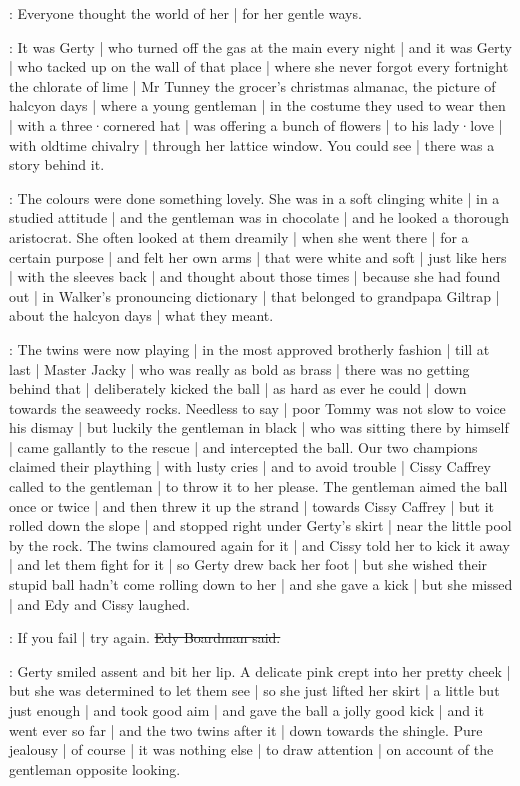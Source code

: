 \gertyNovel:
Everyone thought the world of her |
for her gentle ways.

\gertyReal:
It was Gerty |
who turned off the gas at the main every night |
and it was Gerty |
who tacked up on the wall of that place |
where she never forgot every fortnight the chlorate of lime |
Mr Tunney the grocer's christmas almanac,
the picture of halcyon days |
where a young gentleman |
in the costume they used to wear then |
with a three·cornered hat |
was offering a bunch of flowers |
to his lady·love |
with oldtime chivalry |
through her lattice window.
You could see |
there was a story behind it.

\gertyNovel:
The colours were done something lovely.
She was in a soft clinging white |
in a studied attitude |
and the gentleman was in chocolate |
and he looked a thorough aristocrat.
She often looked at them dreamily |%
when she went there |
for a certain purpose |
and felt her own arms |
that were white and soft |
just like hers |
with the sleeves back |
and thought about those times |
because she had found out |
in Walker's pronouncing dictionary |
that belonged to grandpapa Giltrap |
about the halcyon days |
what they meant.

:
The twins were now playing |
in the most approved brotherly fashion |
till at last |
Master Jacky |
who was really as bold as brass |
there was no getting behind that |
deliberately kicked the ball |
as hard as ever he could |
down towards the seaweedy rocks.
Needless to say |
poor Tommy was not slow to voice his dismay |
but luckily the gentleman in black |
who was sitting there by himself |
came gallantly to the rescue |
and intercepted the ball.%
Our two champions
claimed their plaything |
with lusty cries |
and to avoid trouble |
Cissy Caffrey called to the gentleman |
to throw it to her please.
The gentleman aimed the ball
once or twice |
and then threw it up the strand |
towards Cissy Caffrey |
but it rolled down the slope |
and stopped right under Gerty's skirt |
near the little pool by the rock.
The twins clamoured again for it |
and Cissy told her to kick it away |
and let them fight for it |
so Gerty drew back her foot |
but she wished
their stupid ball hadn't come rolling down to her |
and she gave a kick |
but she missed |
and Edy and Cissy laughed.

\edy:
If you fail |
try again.
\sout{Edy Boardman said.}

\gertyReal:
Gerty smiled assent and bit her lip.%
A delicate pink
crept into her pretty cheek |
but she was determined to let them see |
so she just lifted her skirt |
a little but just enough |
and took good aim |
and gave the ball a jolly good kick |
and it went ever so far |
and the two twins after it |
down towards the shingle.
Pure jealousy |
of course |
it was nothing else |
to draw attention |
on account of the gentleman opposite looking.

